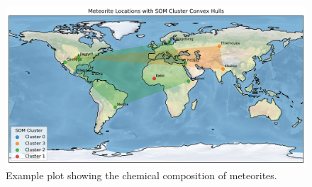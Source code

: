 
\begin{figure}[htbp]
    \centering
    \includegraphics[width=1.0\textwidth]{handin/figures/locations_clusters_convexhull.png}
    \caption{Example plot showing the chemical composition of meteorites.}
    \label{fig:locations}
\end{figure}